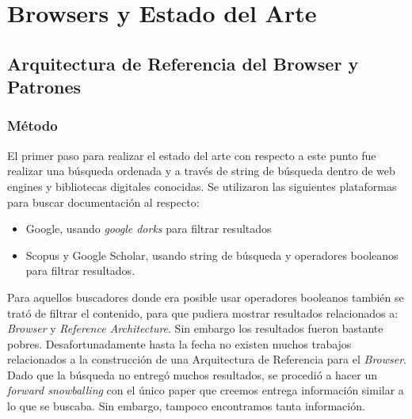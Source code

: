 \chapter{Browsers y Estado del Arte}
\label{chap4:EA}


\section{Arquitectura de Referencia del Browser y Patrones}
\label{chap3:ArqRefBrowandPatt}

\subsection{Método}
El primer paso para realizar el estado del arte con respecto a este punto fue realizar una búsqueda ordenada y a través de string de búsqueda dentro de web engines y bibliotecas digitales conocidas. Se utilizaron las siguientes plataformas para buscar documentación al respecto:
\begin{itemize}
    \item Google, usando \textit{google dorks} para filtrar resultados
    \item Scopus y Google Scholar, usando string de búsqueda y operadores booleanos para filtrar resultados.
\end{itemize}

Para aquellos buscadores donde era posible usar operadores booleanos también se trató de filtrar el contenido, para que pudiera mostrar resultados relacionados a: \textit{Browser} y \textit{Reference Architecture}. Sin embargo los resultados fueron bastante pobres. Desafortunadamente hasta la fecha no existen muchos trabajos relacionados a la construcción de una Arquitectura de Referencia para el \textit{Browser}. Dado que la búsqueda no entregó muchos resultados, se procedió a hacer un \textit{forward snowballing} con el único paper que creemos entrega información similar a lo que se buscaba. Sin embargo, tampoco encontramos tanta información.

